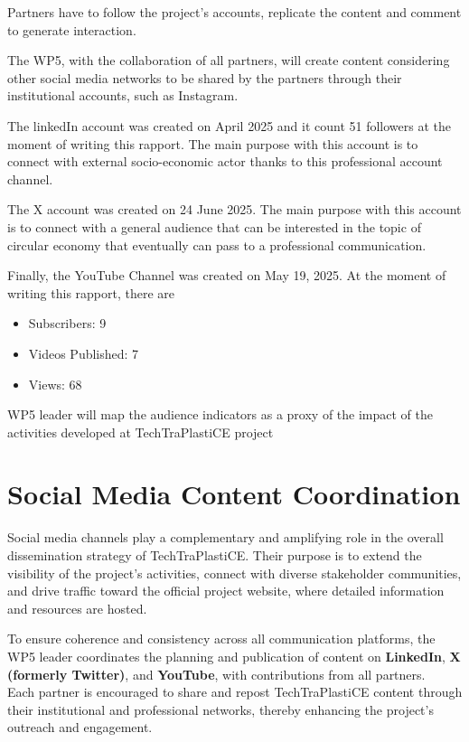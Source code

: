\documentclass[
  12pt,
  oneside]{book}
\providecommand{\tightlist}{%
  \setlength{\itemsep}{0pt}\setlength{\parskip}{0pt}}
\begin{document}
Partners have to follow the project's accounts, replicate the content
and comment to generate interaction.

The WP5, with the collaboration of all partners, will create content
considering other social media networks to be shared by the partners
through their institutional accounts, such as Instagram.

The linkedIn account was created on April 2025 and it count 51 followers
at the moment of writing this rapport. The main purpose with this
account is to connect with external socio-economic actor thanks to this
professional account channel.

The X account was created on 24 June 2025. The main purpose with this
account is to connect with a general audience that can be interested in
the topic of circular economy that eventually can pass to a professional
communication.

Finally, the YouTube Channel was created on May 19, 2025. At the moment
of writing this rapport, there are

\begin{itemize}
\tightlist
\item
  Subscribers: 9
\item
  Videos Published: 7
\item
  Views: 68
\end{itemize}

WP5 leader will map the audience indicators as a proxy of the impact of
the activities developed at TechTraPlastiCE project

\section{Social Media Content
Coordination}\label{social-media-content-coordination}

Social media channels play a complementary and amplifying role in the
overall dissemination strategy of TechTraPlastiCE. Their purpose is to
extend the visibility of the project's activities, connect with diverse
stakeholder communities, and drive traffic toward the official project
website, where detailed information and resources are hosted.

To ensure coherence and consistency across all communication platforms,
the WP5 leader coordinates the planning and publication of content on
\textbf{LinkedIn}, \textbf{X (formerly Twitter)}, and \textbf{YouTube},
with contributions from all partners.\\
Each partner is encouraged to share and repost TechTraPlastiCE content
through their institutional and professional networks, thereby enhancing
the project's outreach and engagement.
\end{document}
